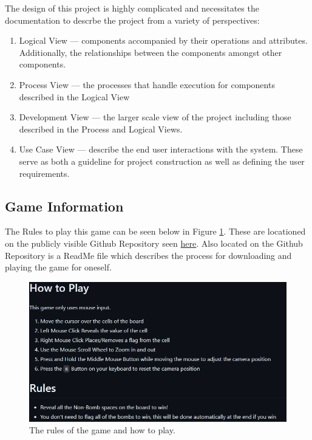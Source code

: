 The design of this project is highly complicated and necessitates the documentation to descrbe the project from a variety of perspectives:
\begin{enumerate}
    \item Logical View --- components accompanied by their operations and attributes. Additionally, the relationships between the components amongst other components.
    \item Process View --- the processes that handle execution for components described in the Logical View
    \item Development View --- the larger scale view of the project including those described in the Process and Logical Views.
    \item Use Case View --- describe the end user interactions with the system. 
    These serve as both a guideline for project construction as well as defining the user requirements.
\end{enumerate}

\subsection{Game Information}
\label{subsec:GameInfo}

The Rules to play this game can be seen below in Figure \ref{Fig:HowToPlay}. These are locationed on the publicly visible Github Repository seen \href{https://github.com/EZRA-DVLPR/MineSweeper3D}{here}.
Also located on the Github Repository is a ReadMe file which describes the process for downloading and playing the game for oneself.

\begin{figure}[h]
    \centering
    \includegraphics[width=13cm]{Images/HowToPlay.png}
       \caption{The rules of the game and how to play.}
           \label{Fig:HowToPlay}
\end{figure}